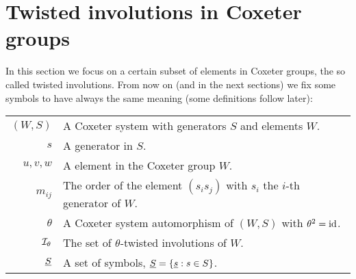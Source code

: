 \section{Twisted involutions in Coxeter groups}
\label{sec:twisted-involutions}

In this section we focus on a certain subset of elements in Coxeter groups, the so called twisted involutions. From now on (and in the next sections) we fix some symbols to have always the same meaning (some definitions follow later):

\vspace*{1em}

\begin{tabular}{rl}
	$(W,S)$			& A Coxeter system with generators $S$ and elements $W$.\\
	$s$				& A generator in $S$.\\
	$u,v,w$			& A element in the Coxeter group $W$.\\
	$m_{ij}$		& The order of the element $(s_i s_j)$ with $s_i$ the $i$-th generator of $W$.\\
	$\theta$		& A Coxeter system automorphism of $(W,S)$ with $\theta^2 = \operatorname{id}$.\\
	$\mathcal{I}_{\theta}$	& The set of $\theta$-twisted involutions of $W$.\\
	$\underline{S}$			& A set of symbols, $\underline{S} = \{ \underline{s} : s \in S \}$.\\
\end{tabular}




